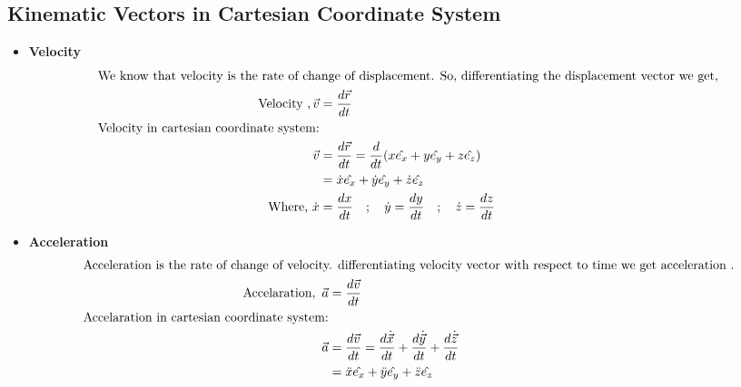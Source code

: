 \subsection{Kinematic Vectors in Cartesian Coordinate System}
\begin{itemize}
	\item \textbf{Velocity}
	\begin{align*}
	\intertext{We know that velocity is the rate of change of displacement. So, differentiating the displacement vector we get,}
	\text { Velocity }, \vec{v}&=\frac{d \vec{r}}{d t}\\
	\text{Velocity in cartesian coordinate system:} \\
	\vec{v}&=\frac{d \vec{r}}{d t}=\frac{d}{d t}(x \hat{e_{x}}+y \hat{e_{y}}+z \hat{e_{z}})\\&=\dot{x} \hat{e_{x}}+\dot{y} \hat{e_{y}}+\dot{z} \hat{e_{z}}\\
	\text{Where,} \ \dot{x}&=\frac{dx}{dt}\quad ;\quad \dot{y}=\frac{dy}{dt}\quad ;\quad\dot{z}=\frac{dz}{dt}
	\end{align*}
	
	\item \textbf{Acceleration}
	\begin{align*}
	\intertext{Acceleration is the rate of change of velocity. differentiating velocity vector with respect to time we get acceleration .}
	\text{Accelaration} ,\ \vec{a}&=\frac{d \vec{v}}{d t}\\
	\text{Accelaration in cartesian coordinate system:}\\ \vec{a}&=\frac{d \vec{v}}{d t}=\frac{d \dot{\vec{x}}}{d t}+\frac{d \dot{\vec{y}}}{d t}+\frac{d \dot{\vec{z}}}{d t}\\&=\ddot{x} \hat{e_{x}}+\ddot{y} \hat{e_{y}}+\ddot{z} \hat{e_{z}}
	\end{align*}
	
	
\end{itemize}

